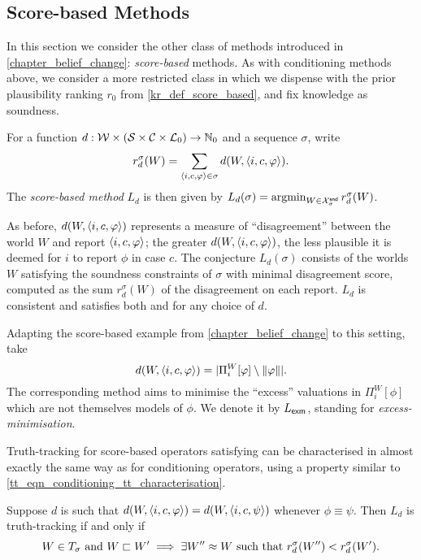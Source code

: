 \subsection{Score-based Methods}
\label{tt_sec_score_based_methods}

In this section we consider the other class of methods introduced in
\cref{chapter_belief_change}: \emph{score-based} methods. As with conditioning
methods above, we consider a more restricted class in which we dispense with
the prior plausibility ranking $r_0$ from \cref{kr_def_score_based}, and fix
knowledge as soundness.

\begin{definition}
    For a function $d: \mathcal{W} \times (\mathcal{S} \times \mathcal{C} \times \mathcal{L}_0) \to
    \mathbb{N}_{0}$ and a sequence $\sigma$, write
    \[
        r_d^\sigma(W)
        = \sum_{\langle {i, c, \varphi} \rangle \in \sigma}{d(W, \langle {i, c, \varphi} \rangle)}.
    \]
    The \emph{score-based method} $L_d$ is then given by
    $L_d(\sigma) = \argmin_{W \in \Xsnd_\sigma}{r_d^\sigma(W)}$.
\end{definition}

As before, $d(W, \langle {i, c, \varphi} \rangle)$ represents a measure of ``disagreement''
between the world $W$ and report $\langle {i, c, \varphi} \rangle$; the greater $d(W,
\langle {i, c, \varphi} \rangle)$, the less plausible it is deemed for $i$ to report $\phi$
in case $c$. The conjecture $L_d(\sigma)$ consists of the worlds $W$ satisfying
the soundness constraints of $\sigma$ with minimal disagreement score, computed
as the sum $r_d^\sigma(W)$ of the disagreement on each report.
%
$L_d$ is consistent and satisfies both \repetition{} and \soundness{} for any
choice of $d$.

\begin{example}
    \label{tt_ex_exm}
    Adapting the score-based example from \cref{chapter_belief_change} to this
    setting, take
    \[
        d(W, \langle {i, c, \varphi} \rangle)
        = |\Pi^W_i[\varphi] \setminus \|{\varphi}\||.
    \]
    The corresponding method aims to minimise the ``excess'' valuations
    in $\Pi^W_i[\phi]$ which are not themselves models of $\phi$. We denote
    it by $L_{\mathsf{exm}}$, standing for \emph{excess-minimisation}.
\end{example}

Truth-tracking for score-based operators satisfying \equivalence{} can be
characterised in almost exactly the same way as for conditioning operators,
using a property similar to \cref{tt_eqn_conditioning_tt_characterisation}.

\begin{theorem}
    \label{tt_thm_scorebased_tt_suff_cond}
    Suppose $d$ is such that $d(W, \langle {i, c, \varphi} \rangle) = d(W, \langle {i, c,
    \psi} \rangle)$ whenever $\phi \equiv \psi$. Then $L_d$ is truth-tracking if and
    only if
    \begin{equation}
        \label{tt_eqn_scorebased_tt_characterisation}
        W \in T_\sigma \text{ and }
            W \sqsubset W'
                \implies
                    \exists W'' \approx W \text{ such that }
                        r_d^\sigma(W'') < r_d^\sigma(W').
    \end{equation}
\end{theorem}

